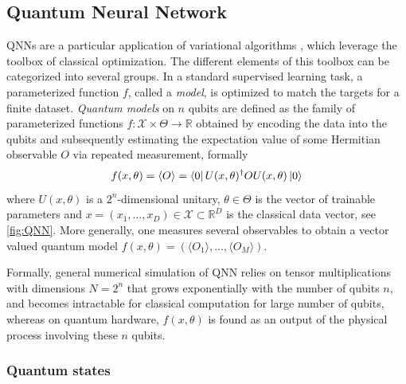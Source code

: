 \documentclass[aps,10pt,groupedaddress,prx,superscriptaddress,twocolumn,balancelastpage, tightenlines]{revtex4-2}
\theoremstyle{plain}  %
\begin{document}
    
    \subsection{Quantum Neural Network}
\label{sec: Quantum Neural_Network}

QNNs are a particular application of variational algorithms \cite{cerezo_variational_2021}, which leverage the toolbox of classical optimization. The different elements of this toolbox can be categorized into several groups. In a standard supervised learning task, a parameterized function $f$, called a \emph{model}, is optimized to match the targets for a finite dataset. \emph{Quantum models} on $n$ qubits are defined as the family of parameterized functions $f : \mathcal{X} \times \Theta \rightarrow \mathbb{R}$ obtained by encoding the data into the qubits and subsequently estimating the expectation value of some Hermitian observable $O$ via repeated measurement, formally 
 \begin{equation}\label{eq:quantum_Model}
    f(x,\theta) = \langle O\rangle = \bra{0} U(x,\theta)^\dagger O U(x,\theta) \ket{0} 
 \end{equation}
where $U(x,\theta)$ is a $2^n$-dimensional unitary, $\theta \in \Theta$ is the vector of trainable parameters and $x= (x_1,\dots,x_D) \in \mathcal{X} \subset \mathbb{R}^D$ is the classical data vector, see \autoref{fig:QNN}. More generally, one measures several observables to obtain a vector valued quantum model $f(x,\theta) = \left(\langle O_1\rangle,\dots, \langle O_M\rangle \right)$. 

Formally, general numerical simulation of QNN relies on tensor multiplications with dimensions $N=2^n$ that grows exponentially with the number of qubits $n$, and becomes intractable for classical computation for large number of qubits, whereas on quantum hardware,  $f(x,\theta)$ is found as an output of the physical process involving these $n$ qubits. 


        \subsubsection{Quantum states}\label{sec:quantum-states}
\end{document}
